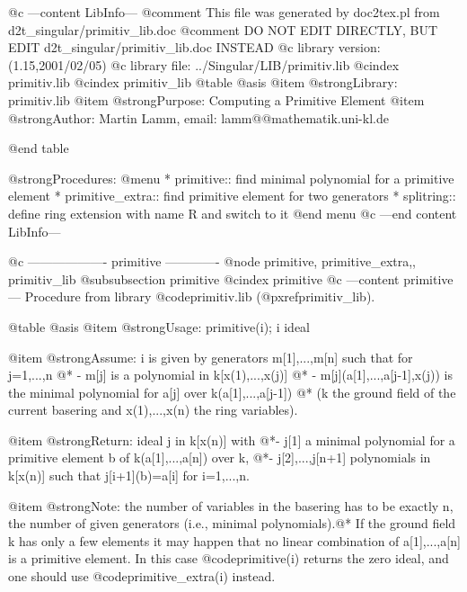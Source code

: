@c ---content LibInfo---
@comment This file was generated by doc2tex.pl from d2t_singular/primitiv_lib.doc
@comment DO NOT EDIT DIRECTLY, BUT EDIT d2t_singular/primitiv_lib.doc INSTEAD
@c library version: (1.15,2001/02/05)
@c library file: ../Singular/LIB/primitiv.lib
@cindex primitiv.lib
@cindex primitiv_lib
@table @asis
@item @strong{Library:}
primitiv.lib
@item @strong{Purpose:}
    Computing a Primitive Element
@item @strong{Author:}
Martin Lamm, email: lamm@@mathematik.uni-kl.de

@end table

@strong{Procedures:}
@menu
* primitive:: find minimal polynomial for a primitive element
* primitive_extra:: find primitive element for two generators
* splitring:: define ring extension with name R and switch to it
@end menu
@c ---end content LibInfo---

@c ------------------- primitive -------------
@node primitive, primitive_extra,, primitiv_lib
@subsubsection primitive
@cindex primitive
@c ---content primitive---
Procedure from library @code{primitiv.lib} (@pxref{primitiv_lib}).

@table @asis
@item @strong{Usage:}
primitive(i); i ideal

@item @strong{Assume:}
i is given by generators m[1],...,m[n] such that for j=1,...,n @*
- m[j] is a polynomial in k[x(1),...,x(j)] @*
- m[j](a[1],...,a[j-1],x(j)) is the minimal polynomial for a[j] over
k(a[1],...,a[j-1]) @*
(k the ground field of the current basering and x(1),...,x(n)
the ring variables).

@item @strong{Return:}
ideal j in k[x(n)] with
@*- j[1] a minimal polynomial for a primitive element b of 
k(a[1],...,a[n]) over k,
@*- j[2],...,j[n+1] polynomials in k[x(n)] such that j[i+1](b)=a[i]
for i=1,...,n.

@item @strong{Note:}
the number of variables in the basering has to be exactly n,
the number of given generators (i.e., minimal polynomials).@*
If the ground field k has only a few elements it may happen that no
linear combination of a[1],...,a[n] is a primitive element. In this
case @code{primitive(i)} returns the zero ideal, and one should use
@code{primitive_extra(i)} instead.

